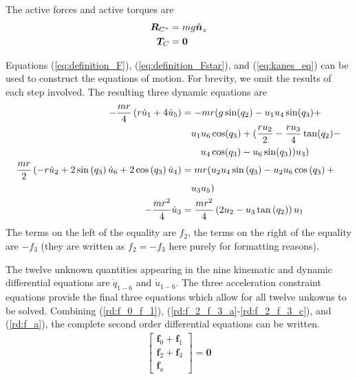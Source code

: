 The active forces and active torques are
\begin{align}
  \boldsymbol{R}_{C^*} &= m g \hat{\boldsymbol{n}}_{z} \\
  \boldsymbol{T}_C &= \boldsymbol{0}
\end{align}

Equations (\ref{eq:definition_F}), (\ref{eq:definition_Fstar}), and
(\ref{eq:kanes_eq}) can be used to construct the equations of motion.  For
brevity, we omit the results of each step involved. The resulting three dynamic
equations are
\begin{align}
 - \frac{m r}{4} \left(r \dot{u}_{1} + 4 \dot{u}_{5}\right) &=
 - m r ( g  \sin(q_2) - u_1 u_4 \sin(q_3) + \notag\\
 & \quad u_1 u_6 \cos(q_3) + (\frac{r u_2}{2} - \frac{r u_3}{4} \tan(q_2) - \notag \\
 & \quad\quad u_4 \cos(q_3) - u_6 \sin(q_3)) u_3 ) \label{rd:f_2_f_3_a} \\
\frac{m r}{2} \left(- r \dot{u}_{2} + 2
                \sin\left(q_{3}\right) \dot{u}_{6} + 2 \cos\left(q_{3}\right)
                \dot{u}_{4}\right) &= m r ( u_{2} u_{4}
                \sin\left(q_{3}\right) - u_{2} u_{6}
                \cos\left(q_{3}\right) +\notag\\
                & \quad u_{3} u_{5}) \label{rd:f_2_f_3_b} \\
- \frac{m r^{2}}{4} \dot{u}_{3} &= \frac{m r^{2}}{4} \left(2 u_{2} - u_{3} \tan\left(q_{2}\right)\right) u_{1} \label{rd:f_2_f_3_c}
\end{align}
The terms on the left of the equality are $f_2$, the terms on the right of the
equality are $-f_3$ (they are written as $f_2 = -f_3$ here purely for
formatting reasons).

The twelve unknown quantities appearing in the nine kinematic and dynamic
differential equations are $\dot{q}_{1-6}$ and $\dot{u}_{1-6}$. The three
acceleration constraint equations provide the final three equations which allow
for all twelve unkowns to be solved. Combining (\ref{rd:f_0_f_1}),
(\ref{rd:f_2_f_3_a}-\ref{rd:f_2_f_3_c}), and (\ref{rd:f_a}), the complete second order differential
equations can be written.
\begin{align}
\label{rd:ode}
\begin{bmatrix} \mathbf{f}_0 + \mathbf{f}_1\\
                \mathbf{f}_2 + \mathbf{f}_3\\
                \mathbf{f}_a \end{bmatrix} = \mathbf{0}
\end{align}

